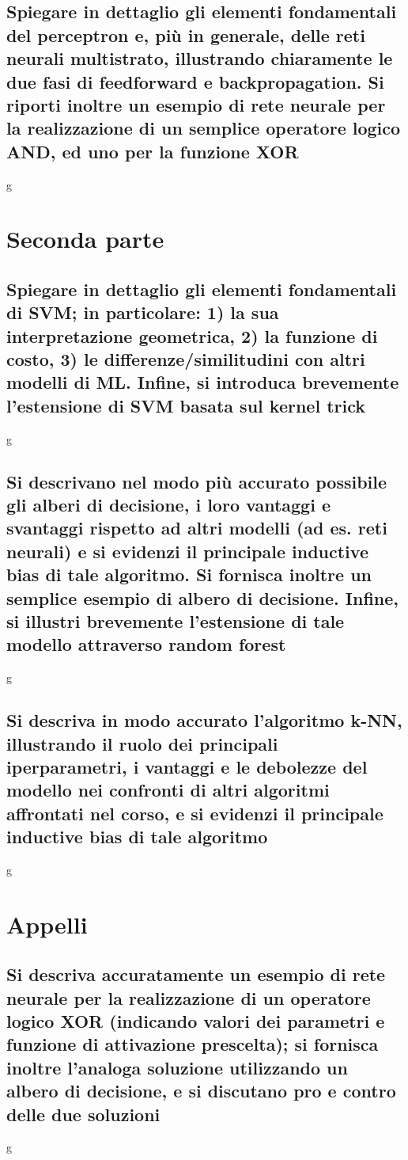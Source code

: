 \documentclass[10pt,oneside,a4paper]{article}
\begin{document}
\subsection{Spiegare in dettaglio gli elementi fondamentali del perceptron e, più in generale, delle reti
	neurali multistrato, illustrando chiaramente le due fasi di feedforward e backpropagation.
	Si riporti inoltre un esempio di rete neurale per la realizzazione di un semplice operatore
	logico AND, ed uno per la funzione XOR}
g
\section{Seconda parte}
\subsection{Spiegare in dettaglio gli elementi fondamentali di SVM; in particolare: 1) la sua interpretazione geometrica, 2) la funzione di costo, 3) le differenze/similitudini con altri modelli di ML. Infine, si introduca brevemente l’estensione di SVM basata sul kernel trick}
g
\subsection{Si descrivano nel modo più accurato possibile gli alberi di decisione, i loro vantaggi e svantaggi rispetto ad altri modelli (ad es. reti neurali) e si evidenzi il principale inductive bias di tale algoritmo. Si fornisca inoltre un semplice esempio di albero di decisione. Infine, si illustri brevemente l’estensione di tale modello attraverso random forest}
g
\subsection{Si descriva in modo accurato l’algoritmo k-NN, illustrando il ruolo dei principali iperparametri, i vantaggi e le debolezze del modello nei confronti di altri algoritmi affrontati nel corso, e si evidenzi il principale inductive bias di tale algoritmo}
g
\section{Appelli}
\subsection{Si descriva accuratamente un esempio di rete neurale per la realizzazione di un operatore logico XOR (indicando valori dei parametri e funzione di attivazione prescelta); si fornisca inoltre l’analoga soluzione utilizzando un albero di decisione, e si discutano pro e contro delle due soluzioni}
g
\end{document}
